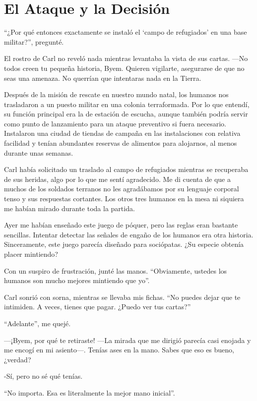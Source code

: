 \chapter{El Ataque y la Decisión}\label{sec:el-ataque-y-la-decision}

``¿Por qué entonces exactamente se instaló el ‘campo de refugiados’ en una base militar?'', pregunté.

El rostro de Carl no reveló nada mientras levantaba la vista de sus cartas. —No todos creen tu pequeña historia, Byem. Quieren vigilarte, asegurarse de que no seas una amenaza. No querrían que intentaras nada en la Tierra.

Después de la misión de rescate en nuestro mundo natal, los humanos nos trasladaron a un puesto militar en una colonia terraformada. Por lo que entendí, su función principal era la de estación de escucha, aunque también podría servir como punto de lanzamiento para un ataque preventivo si fuera necesario. Instalaron una ciudad de tiendas de campaña en las instalaciones con relativa facilidad y tenían abundantes reservas de alimentos para alojarnos, al menos durante unas semanas.

Carl había solicitado un traslado al campo de refugiados mientras se recuperaba de sus heridas, algo por lo que me sentí agradecido. Me di cuenta de que a muchos de los soldados terranos no les agradábamos por su lenguaje corporal tenso y sus respuestas cortantes. Los otros tres humanos en la mesa ni siquiera me habían mirado durante toda la partida.

Ayer me habían enseñado este juego de póquer, pero las reglas eran bastante sencillas. Intentar detectar las señales de engaño de los humanos era otra historia. Sinceramente, este juego parecía diseñado para sociópatas. ¿Su especie obtenía placer mintiendo?

Con un suspiro de frustración, junté las manos. ``Obviamente, ustedes los humanos son mucho mejores mintiendo que yo''.

Carl sonrió con sorna, mientras se llevaba mis fichas. ``No puedes dejar que te intimiden. A veces, tienes que pagar. ¿Puedo ver tus cartas?''


``Adelante'', me quejé.

—¡Byem, por qué te retiraste! —La mirada que me dirigió parecía casi enojada y me encogí en mi asiento—. Tenías ases en la mano. Sabes que eso es bueno, ¿verdad?

-Sí, pero no sé qué tenías.

``No importa. Esa es literalmente la mejor mano inicial''.


